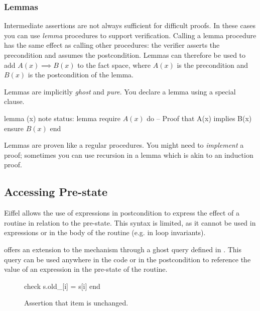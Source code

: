 \subsubsection*{Lemmas}

Intermediate assertions are not always sufficient for difficult proofs. In these cases you can use \emph{lemma} procedures to support verification. Calling a lemma procedure has the same effect as calling other procedures: the verifier asserts the precondition and assumes the postcondition. Lemmas can therefore be used to add $A(x)\implies B(x)$ to the fact space, where $A(x)$ is the precondition and $B(x)$ is the postcondition of the lemma.

Lemmas are implicitly \emph{ghost} and \emph{pure}. You declare a lemma using a special  clause.
\begin{erunning}
lemma (x)
	note status: lemma
	require
		$A (x)$
	do
		-- Proof that A(x) implies B(x)
	ensure
		$B (x)$
	end
\end{erunning}

Lemmas are proven like a regular procedures. You might need to \emph{implement} a proof; sometimes you can use recursion in a lemma which is akin to an induction proof.

\subsection{Accessing Pre-state}

Eiffel allows the use of  expressions in postcondition to express the effect of a routine in relation to the pre-state. This syntax is limited, as it cannot be used in  expressions or in the body of the routine (e.g. in loop invariants).

\AutoProof offers an extension to the  mechanism through a ghost query  defined in . This query can be used anywhere in the code or in the postcondition to reference the value of an expression in the pre-state of the routine.

\begin{figure}
\begin{erunning}[numbers=none]
check s.old_[i] = s[i] end
\end{erunning}
\hspace{0.5cm}
\caption*{Assertion that item  is unchanged.}
\end{figure}

